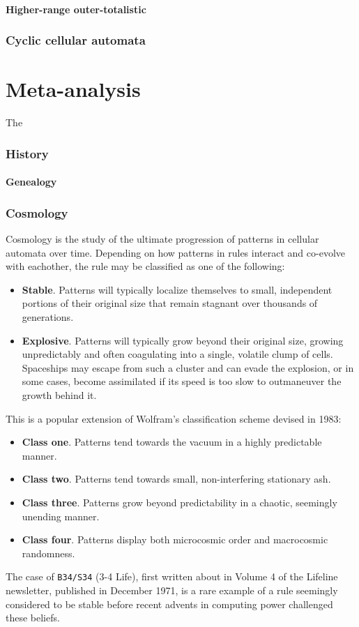 \documentclass[
	11pt, %
	fleqn, %
	a4paper, %
]{LegrandOrangeBook}
\begin{document}
\subsection{Higher-range outer-totalistic}
\section {Cyclic cellular automata}
\part{Meta-analysis}
The
\section{History}
\subsection{Genealogy}
\section{Cosmology}
Cosmology is the study of the ultimate progression of patterns in cellular automata over time. Depending on how patterns in rules interact and co-evolve with eachother, the rule may be classified as one of the following:
\begin{itemize}
\item \textbf{Stable}. Patterns will typically localize themselves to small, independent portions of their original size that remain stagnant over thousands of generations.
\item \textbf{Explosive}. Patterns will typically grow beyond their original size, growing unpredictably and often coagulating into a single, volatile clump of cells. Spaceships may escape from such a cluster and can evade the explosion, or in some cases, become assimilated if its speed is too slow to outmaneuver the growth behind it.
\end{itemize}
This is a popular extension of Wolfram's classification scheme devised in 1983:
\begin{itemize}
\item \textbf{Class one}. Patterns tend towards the vacuum in a highly predictable manner.
\item \textbf{Class two}. Patterns tend towards small, non-interfering stationary ash.
\item \textbf{Class three}. Patterns grow beyond predictability in a chaotic, seemingly unending manner.
\item \textbf{Class four}. Patterns display both microcosmic order and macrocosmic randomness.
\end{itemize}
The case of \texttt{B34/S34} (3-4 Life), first written about in Volume 4 of the Lifeline newsletter, published in December 1971, is a rare example of a rule seemingly considered to be stable before recent advents in computing power challenged these beliefs.
\end{document}
